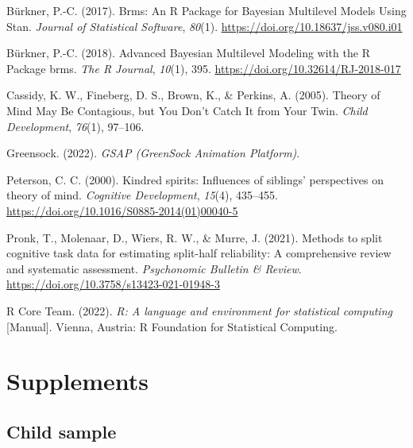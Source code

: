\documentclass[
  man,floatsintext]{apa6}
\newlength{\cslhangindent}
\newlength{\cslentryspacingunit} %
\newenvironment{CSLReferences}[2] %
 {%
  \setlength{\parindent}{0pt}
  \ifodd #1
  \let\oldpar\par
  \def\par{\hangindent=\cslhangindent\oldpar}
  \fi
  \setlength{\parskip}{#2\cslentryspacingunit}
 }%
 {}
\begin{document}
\hypertarget{refs}{}
\begin{CSLReferences}{1}{0}
\leavevmode{}%
Bürkner, P.-C. (2017). Brms: {An R Package} for {Bayesian Multilevel Models Using Stan}. \emph{Journal of Statistical Software}, \emph{80}(1). \url{https://doi.org/10.18637/jss.v080.i01}

\leavevmode{}%
Bürkner, P.-C. (2018). Advanced {Bayesian Multilevel Modeling} with the {R Package} brms. \emph{The R Journal}, \emph{10}(1), 395. \url{https://doi.org/10.32614/RJ-2018-017}

\leavevmode{}%
Cassidy, K. W., Fineberg, D. S., Brown, K., \& Perkins, A. (2005). Theory of {Mind May Be Contagious}, but {You Don}'t {Catch It} from {Your Twin}. \emph{Child Development}, \emph{76}(1), 97--106.

\leavevmode{}%
Greensock. (2022). \emph{{GSAP} ({GreenSock Animation Platform})}.

\leavevmode{}%
Peterson, C. C. (2000). Kindred spirits: {Influences} of siblings' perspectives on theory of mind. \emph{Cognitive Development}, \emph{15}(4), 435--455. \url{https://doi.org/10.1016/S0885-2014(01)00040-5}

\leavevmode{}%
Pronk, T., Molenaar, D., Wiers, R. W., \& Murre, J. (2021). Methods to split cognitive task data for estimating split-half reliability: {A} comprehensive review and systematic assessment. \emph{Psychonomic Bulletin \& Review}. \url{https://doi.org/10.3758/s13423-021-01948-3}

\leavevmode{}%
R Core Team. (2022). \emph{R: {A} language and environment for statistical computing} {[}Manual{]}. {Vienna, Austria}: {R Foundation for Statistical Computing}.

\end{CSLReferences}

\endgroup

\newpage

\hypertarget{supplements}{%
\section{Supplements}\label{supplements}}

\hypertarget{child-sample}{%
\subsection{Child sample}\label{child-sample}}
\end{document}
